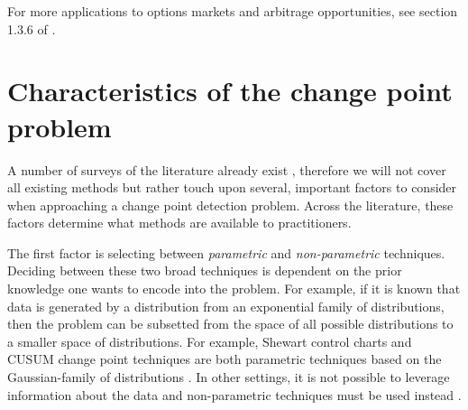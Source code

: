 For more applications to options markets and arbitrage opportunities, see section 1.3.6 of \cite{tartakovsky2014sequential}.


\section{Characteristics of the change point problem}
A number of surveys of the literature already exist \cite{aminikhanghahi2017survey} \cite{niu2016multiple}, therefore we will not cover all existing methods but rather touch upon several, important factors to consider when approaching a change point detection problem. Across the literature, these factors determine what methods are available to practitioners. %

The first factor is selecting between \textit{parametric} and \textit{non-parametric} techniques. Deciding between these two broad techniques is dependent on the prior knowledge one wants to encode into the problem. For example, if it is known that data is generated by a distribution from an exponential family of distributions, then the problem can be subsetted from the space of all possible distributions to a smaller space of distributions. For example, Shewart control charts and CUSUM change point techniques are both parametric techniques based on the Gaussian-family of distributions \cite{page1954continuous} \cite{chen2011parametric}. In other settings, it is not possible to leverage information about the data and non-parametric techniques must be used instead \cite{brodsky2013nonparametric}.


